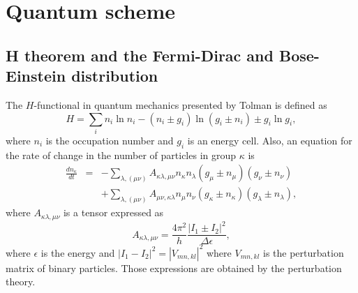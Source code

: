 \section{Quantum scheme}\label{sec:quantum}

\subsection{H theorem and the Fermi-Dirac and Bose-Einstein distribution}

The $H$-functional in quantum mechanics presented by Tolman \cite{bib:tolman}
is defined as
%
\begin{equation}\label{quantumh}
    H=\sum_i n_i \ln n_i -(n_i\pm g_i)\ln (g_i \pm n_i)\pm g_i\ln g_i, 
\end{equation}
%
where $n_i$ is the occupation number and $g_i$ is an energy cell. Also, an
equation for the rate of change in the number of particles in group $\kappa$ is
%
\begin{eqnarray}
    \frac{d n_{\kappa}}{dt}&=&-\sum_{\lambda,(\mu \nu)}A_{\kappa\lambda,\mu\nu} n_{\kappa}n_{\lambda}(g_{\mu}\pm n_{\mu})(g_{\nu}\pm n_{\nu})\nonumber \\
    &&+\sum_{\lambda,(\mu \nu)}A_{\mu\nu,\kappa\lambda} n_{\mu}n_{\nu}(g_{\kappa}\pm n_{\kappa})(g_{\lambda}\pm n_{\lambda}),\label{changen}
\end{eqnarray}
%
where $A_{\kappa\lambda,\mu\nu}$ is a tensor expressed as
%
\begin{equation}
  A_{\kappa\lambda,\mu\nu}=\frac{4\pi^{2}}{h}\frac{|I_1\pm I_2|^2}{\Delta \epsilon},
\end{equation}
%
where $\epsilon$ is the energy and $|I_1-I_2|^2=|V_{mn,kl}|^2$ where
$V_{mn,kl}$ is the perturbation matrix of binary particles. Those expressions
are obtained by the perturbation theory.

